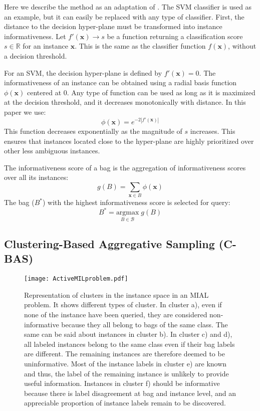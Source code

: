 \documentclass{article}
\begin{document}
Here we describe the method as an adaptation of \cite{Tong2001}. The SVM classifier is used as an example, but it can easily be replaced with any type of classifier. First, the distance to the decision hyper-plane must be transformed into instance informativeness. Let $f'(\textbf{x}) \rightarrow s$ be a function returning a classification score $s \in \mathbb{R}$ for an instance $\textbf{x}$. This is the same as the classifier function $f(\textbf{x})$, without a decision threshold.

For an SVM, the decision hyper-plane is defined by  $f'(\textbf{x}) = 0$. The informativeness of an instance can be obtained using a radial basis function $\phi(\textbf{x})$ centered at 0. Any type of function can be used as long as it is maximized at the decision threshold, and it decreases monotonically with distance. In this paper we use: 
\begin{equation}
\phi(\textbf{x}) = e^{-2\left | f'(\textbf{x})  \right |} 
\label{Eq:scoreInformativeness}
\end{equation}
This function  decreases exponentially as the magnitude of $s$ increases. This ensures that instances located close to the hyper-plane are highly prioritized over other less ambiguous instances. 

The informativeness score of a bag is the aggregation of informativeness scores over all its instances:
\begin{equation}
g(B) = \sum_{\textbf{x} \in B} \phi \left( \textbf{x}  \right )
\label{Equation:Agrregation}
\end{equation}
The bag ($B^*$) with the highest informativeness score is selected for query:
\begin{equation}
B^*=\underset{B \in \mathcal{B}}{\text{argmax}} \; g(B)
\label{Equation:argmax}
\end{equation}





\subsection{Clustering-Based Aggregative Sampling (C-BAS)}
\begin{figure*}[!t]
\centering
\texttt{[image: ActiveMILproblem.pdf]}
\caption{Representation of clusters in the instance space in an MIAL problem. It shows different types of cluster. In cluster a), even if none of the instance have been queried, they are considered non-informative because they all belong to bags of the same class. The same can be said about instances in cluster b). In cluster c) and d), all labeled instances belong to the same class even if their bag labels are different. The remaining instances are therefore deemed to be uninformative. Most of the instance labels in cluster e) are known and thus, the label of the remaining instance is unlikely to provide useful information. Instances in cluster f) should be informative because there is label disagreement at bag and instance level, and an appreciable proportion of instance labels remain to be discovered.}
\label{Fig:ClusterTypes}
\end{figure*}
\end{document}
